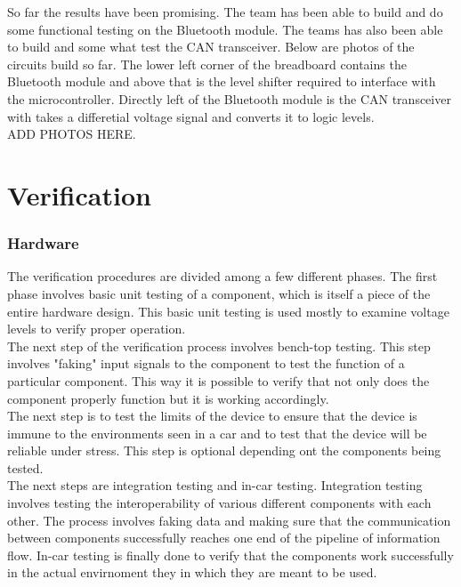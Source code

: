 \documentclass[12pt,letterpaper]{article}
\begin{document}
So far the results have been promising. The team has been able to build and do some functional testing on the Bluetooth module. The teams has also been able to build and some what test the CAN transceiver. Below are photos of the circuits build so far. The lower left corner of the breadboard contains the Bluetooth module and above that is the level shifter required to interface with the microcontroller. Directly left of the Bluetooth module is the CAN transceiver with takes a differetial voltage signal and converts it to logic levels. \\

ADD PHOTOS HERE.

\section{Verification}
\subsubsection{Hardware}
The verification procedures are divided among a few different phases. The first phase involves basic unit testing of a component, which is itself a piece of the entire hardware design. This basic unit testing is used mostly to examine voltage levels to verify proper operation. \\

The next step of the verification process involves bench-top testing. This step involves "faking" input signals to the component to test the function of a particular component. This way it is possible to verify that not only does the component properly function but it is working accordingly. \\

The next step is to test the limits of the device to ensure that the device is immune to the environments seen in a car and to test that the device will be reliable under stress. This step is optional depending ont the components being tested. \\

The next steps are integration testing and in-car testing. Integration testing involves testing the interoperability of various different components with each other. The process involves faking data and making sure that the communication between components successfully reaches one end of the pipeline of information flow. In-car testing is finally done to verify that the components work successfully in the actual envirnoment they in which they are meant to be used.
\end{document}
